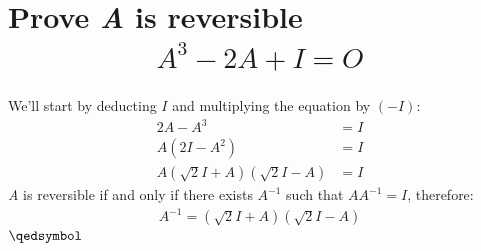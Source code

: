 \documentclass[a4paper, 12pt]{article}
\newcommand{\eq}[1]{\begin{align*}#1\end{align*}}
\renewcommand{\qed}{\hfill\(\qedsymbol\)}
\begin{document}
\setcounter{section}{18}
\section{Prove \textit{A} is reversible\eq{
    A^3-2A+I=O
}}
We'll start by deducting $I$ and multiplying the equation by $(-I)$:
\eq{
    2A-A^3&=I\\
    A(2I-A^2)&=I\\
    A(\sqrt{2}I+A)(\sqrt{2}I-A)&=I
}
\textit{A} is reversible if and only if there exists $A^{-1}$ such that $AA^{-1}=I$, therefore:
\eq{
    A^{-1}=(\sqrt{2}I+A)(\sqrt{2}I-A)
}
\qed

\end{document}
